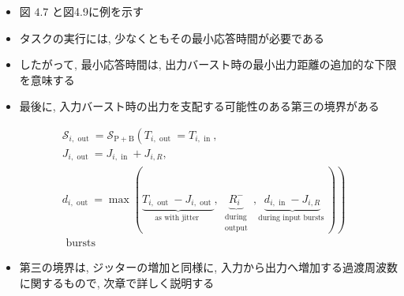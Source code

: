 \begin{frame}{}
    \begin{itemize}
        \item 図 $4.7$ と図4.9に例を示す
        \item タスクの実行には, 少なくともその最小応答時間が必要である
        \item したがって, 最小応答時間は, 出力バースト時の最小出力距離の追加的な下限を意味する
        \item 最後に, 入力バースト時の出力を支配する可能性のある第三の境界がある

    \end{itemize}
    \begin{equation*}
        \begin{aligned}
             & \mathcal{S}_{i, \text { out }}=\mathcal{S}_{\mathrm{P}+\mathrm{B}}\left(T_{i, \text { out }}=T_{i, \text { in }},\right. \\
             & J_{i, \text { out }}=J_{i, \text { in }}+J_{i, R},                                                                                                                                                                                        \\
             & \left.d_{i, \text { out }}=\max (\underbrace{T_{i, \text { out }}-J_{i, \text { out }}}_{\text {as with jitter }}, \underbrace{R_{i}^{-}}_{\begin{array}{c}
                                                                                                                                                                  \text { during } \\
                                                                                                                                                                  \text { output }
                                                                                                                                                              \end{array}}, \underbrace{d_{i, \text { in }}-J_{i, R}}_{\text {during input bursts }})\right) \\
             & \text { bursts }
        \end{aligned}
    \end{equation*}
\end{frame}

\begin{frame}{}
    \begin{itemize}
        \item 第三の境界は, ジッターの増加と同様に, 入力から出力へ増加する過渡周波数に関するもので, 次章で詳しく説明する
    \end{itemize}
\end{frame}


